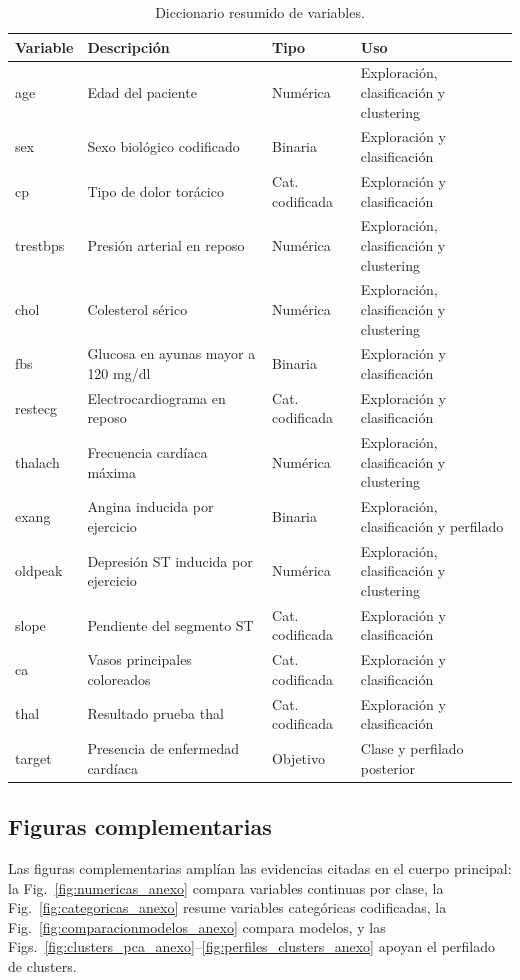 \documentclass[10pt,a4paper]{article}
\begin{document}
\begin{table}[H]
\centering
\scriptsize
\begin{tabularx}{\textwidth}{lXlX}
\toprule
Variable & Descripción & Tipo & Uso \\
\midrule
age & Edad del paciente & Numérica & Exploración, clasificación y clustering \\
sex & Sexo biológico codificado & Binaria & Exploración y clasificación \\
cp & Tipo de dolor torácico & Cat. codificada & Exploración y clasificación \\
trestbps & Presión arterial en reposo & Numérica & Exploración, clasificación y clustering \\
chol & Colesterol sérico & Numérica & Exploración, clasificación y clustering \\
fbs & Glucosa en ayunas mayor a 120 mg/dl & Binaria & Exploración y clasificación \\
restecg & Electrocardiograma en reposo & Cat. codificada & Exploración y clasificación \\
thalach & Frecuencia cardíaca máxima & Numérica & Exploración, clasificación y clustering \\
exang & Angina inducida por ejercicio & Binaria & Exploración, clasificación y perfilado \\
oldpeak & Depresión ST inducida por ejercicio & Numérica & Exploración, clasificación y clustering \\
slope & Pendiente del segmento ST & Cat. codificada & Exploración y clasificación \\
ca & Vasos principales coloreados & Cat. codificada & Exploración y clasificación \\
thal & Resultado prueba thal & Cat. codificada & Exploración y clasificación \\
target & Presencia de enfermedad cardíaca & Objetivo & Clase y perfilado posterior \\
\bottomrule
\end{tabularx}
\caption{Diccionario resumido de variables.}
\label{tab:diccionario}
\end{table}

\subsection{Figuras complementarias}

Las figuras complementarias amplían las evidencias citadas en el cuerpo principal: la Fig.~\ref{fig:numericas_anexo} compara variables continuas por clase, la Fig.~\ref{fig:categoricas_anexo} resume variables categóricas codificadas, la Fig.~\ref{fig:comparacionmodelos_anexo} compara modelos, y las Figs.~\ref{fig:clusters_pca_anexo}--\ref{fig:perfiles_clusters_anexo} apoyan el perfilado de clusters.
\end{document}
